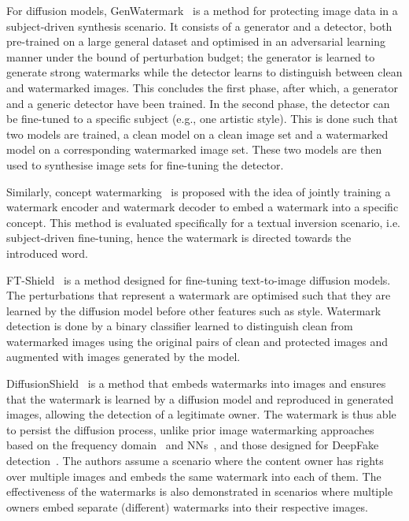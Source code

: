 \documentclass[conference,table]{IEEEtran} %
\begin{document}
For diffusion models, GenWatermark~\cite{ma_generative_2023} is a method for protecting image data in a subject-driven synthesis scenario. 
It consists of a generator and a detector, both pre-trained on a large general dataset and optimised in an adversarial learning manner under the bound of perturbation budget; the generator is learned to generate strong watermarks while the detector learns to distinguish between clean and watermarked images. 
This concludes the first phase, after which, a generator and a generic detector have been trained. 
In the second phase, the detector can be fine-tuned to a specific subject (e.g., one artistic style). 
This is done such that two models are trained, a clean model on a clean image set and a watermarked model on a corresponding watermarked image set. 
These two models are then used to synthesise image sets for fine-tuning the detector.

Similarly, concept watermarking~\cite{feng_catch_2023} is proposed with the idea of jointly training a watermark encoder and watermark decoder to embed a watermark into a specific concept. 
This method is evaluated specifically for a textual inversion scenario, i.e. subject-driven fine-tuning, hence the watermark is directed towards the introduced word.   

FT-Shield~\cite{cui_ft-shield_2023} is a method designed for fine-tuning text-to-image diffusion models. 
The perturbations that represent a watermark are optimised such that they are learned by the diffusion model before other features such as style.
Watermark detection is done by a binary classifier learned to distinguish clean from watermarked images using the original pairs of clean and protected images and augmented with images generated by the model. 

DiffusionShield~\cite{cui_diffusionshield_2023} is a method that embeds watermarks into images and ensures that the watermark is learned by a diffusion model and reproduced in generated images, allowing the detection of a legitimate owner.
The watermark is thus able to persist the diffusion process, unlike prior image watermarking approaches based on the frequency domain~\cite{navas_dwt-dct-svd_2008} and NNs~\cite{zhu_hidden_2018}, and those designed for DeepFake detection~\cite{yu_artificial_2021}.
The authors assume a scenario where the content owner has rights over multiple images and embeds the same watermark into each of them. 
The effectiveness of the watermarks is also demonstrated in scenarios where multiple owners embed separate (different) watermarks into their respective images. 
\end{document}

